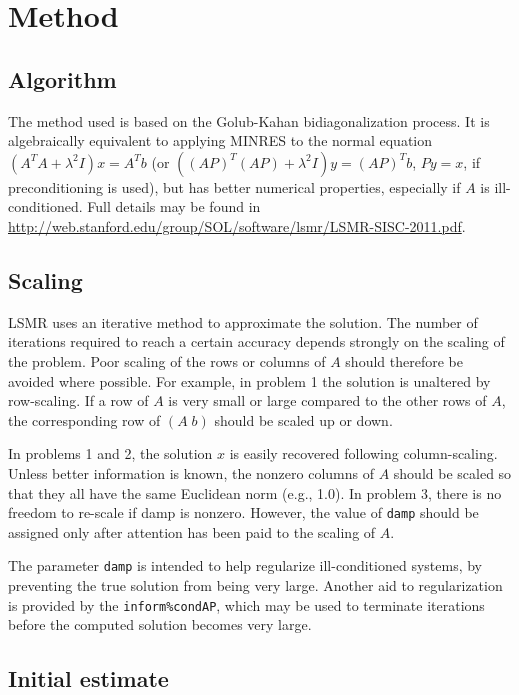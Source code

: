 \section{Method} \label{method}

\subsection{Algorithm}
The method used is based on the Golub-Kahan bidiagonalization process. 
It is algebraically equivalent to applying MINRES to the normal 
equation $(A^TA+\lambda^2I)x=A^Tb$ (or $((AP)^T(AP)+\lambda^2I)y=(AP)^Tb$,
$Py = x$,
if preconditioning is used), but has better numerical properties, 
especially if $A$ is ill-conditioned. 
Full details may be found in
{\url{
http://web.stanford.edu/group/SOL/software/lsmr/LSMR-SISC-2011.pdf}}.

\subsection{Scaling}
     LSMR uses an iterative method to approximate the solution.
     The number of iterations required to reach a certain accuracy
     depends strongly on the scaling of the problem.  Poor scaling of
     the rows or columns of $A $ should therefore be avoided where
     possible. For example, in problem 1 the solution is unaltered by
     row-scaling.  If a row of $A$ is very small or large compared to
     the other rows of $A$, the corresponding row of $ ( A\;  b )$ should be
     scaled up or down.
    
     In problems 1 and 2, the solution $x$ is easily recovered
     following column-scaling.  Unless better information is known,
     the nonzero columns of $A$ should be scaled so that they all have
     the same Euclidean norm (e.g., 1.0).
     In problem 3, there is no freedom to re-scale if damp is
     nonzero.  However, the value of {\tt damp} should be assigned only
     after attention has been paid to the scaling of $A$.
    
     The parameter {\tt damp} is intended to help regularize
     ill-conditioned systems, by preventing the true solution from
     being very large.  Another aid to regularization is provided by
     the {\tt inform\%condAP}, which may be used to terminate iterations
     before the computed solution becomes very large.

\subsection{Initial estimate}
    
